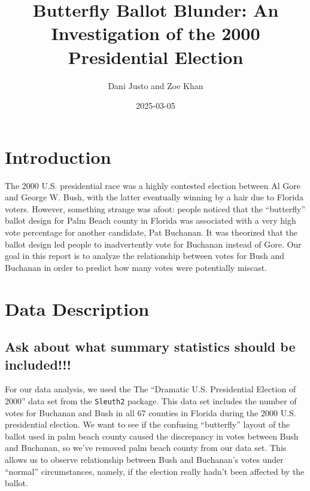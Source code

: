 \documentclass[
  letterpaper,
  DIV=11,
  numbers=noendperiod]{scrartcl}
\title{Butterfly Ballot Blunder: An Investigation of the 2000
Presidential Election}
\author{Dani Justo and Zoe Khan}
\date{2025-03-05}
\begin{document}
\maketitle
\ifdefined\Shaded\renewenvironment{Shaded}{\begin{tcolorbox}[breakable, enhanced, boxrule=0pt, interior hidden, sharp corners, borderline west={3pt}{0pt}{shadecolor}, frame hidden]}{\end{tcolorbox}}\fi

\hypertarget{introduction}{%
\section{Introduction}\label{introduction}}

The 2000 U.S. presidential race was a highly contested election between
Al Gore and George W. Bush, with the latter eventually winning by a hair
due to Florida voters. However, something strange was afoot: people
noticed that the ``butterfly'' ballot design for Palm Beach county in
Florida was associated with a very high vote percentage for another
candidate, Pat Buchanan. It was theorized that the ballot design led
people to inadvertently vote for Buchanan instead of Gore. Our goal in
this report is to analyze the relationship between votes for Bush and
Buchanan in order to predict how many votes were potentially miscast.

\hypertarget{data-description}{%
\section{Data Description}\label{data-description}}

\hypertarget{ask-about-what-summary-statistics-should-be-included}{%
\subsection{Ask about what summary statistics should be
included!!!}\label{ask-about-what-summary-statistics-should-be-included}}

For our data analysis, we used the The ``Dramatic U.S. Presidential
Election of 2000'' data set from the \texttt{Sleuth2} package. This data
set includes the number of votes for Buchanan and Bush in all 67
counties in Florida during the 2000 U.S. presidential election. We want
to see if the confusing ``butterfly'' layout of the ballot used in palm
beach county caused the discrepancy in votes between Bush and Buchanan,
so we've removed palm beach county from our data set. This allows us to
observe relationship between Bush and Buchanan's votes under ``normal''
circumstances, namely, if the election really hadn't been affected by
the ballot.
\end{document}
